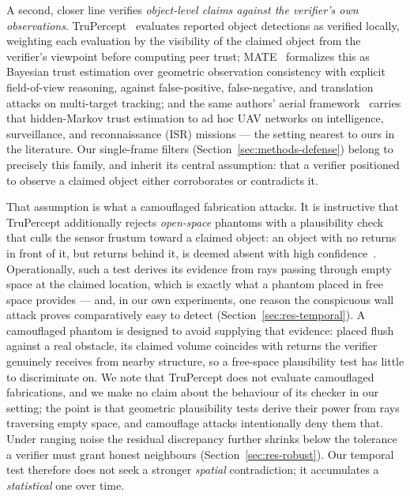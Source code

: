 A second, closer line verifies \emph{object-level claims against the
verifier's own observations}. TruPercept~\cite{trupercept2020} evaluates reported
object detections as verified locally, weighting each evaluation by the
visibility of the claimed object from the verifier's viewpoint before
computing peer trust; MATE~\cite{mate2025} formalizes this as Bayesian trust
estimation over geometric observation consistency with explicit
field-of-view reasoning, against false-positive, false-negative, and
translation attacks on multi-target tracking; and the same authors' aerial
framework~\cite{aerialtrust2025} carries that hidden-Markov trust estimation
to ad hoc UAV networks on intelligence, surveillance, and reconnaissance
(ISR) missions --- the setting nearest to ours in the literature. Our single-frame filters (Section~\ref{sec:methods-defense})
belong to precisely this family, and inherit its central assumption: that a
verifier positioned to observe a claimed object either corroborates or
contradicts it.

That assumption is what a camouflaged fabrication attacks. It is instructive
that TruPercept additionally rejects \emph{open-space} phantoms with a
plausibility check that culls the sensor frustum toward a claimed object: an
object with no returns in front of it, but returns behind it, is deemed
absent with high confidence~\cite{trupercept2020}. Operationally, such a
test derives its evidence from rays passing through empty space at the
claimed location, which is exactly what a phantom placed in free space provides ---
and, in our own experiments, one reason the conspicuous wall attack proves
comparatively easy to detect (Section~\ref{sec:res-temporal}). A camouflaged
phantom is designed to avoid supplying that evidence: placed flush against a
real obstacle, its claimed volume coincides with returns the verifier
genuinely receives from nearby structure, so a free-space plausibility test
has little to discriminate on. We note that TruPercept does not evaluate
camouflaged fabrications, and we make no claim about the behaviour of its
checker in our setting; the point is that geometric plausibility tests
derive their power from rays traversing empty space, and camouflage attacks
intentionally deny them that. Under ranging noise the residual discrepancy
further shrinks below the tolerance a verifier must grant honest neighbours
(Section~\ref{sec:res-robust}). Our temporal test therefore does not seek a
stronger \emph{spatial} contradiction; it accumulates a \emph{statistical}
one over time.

